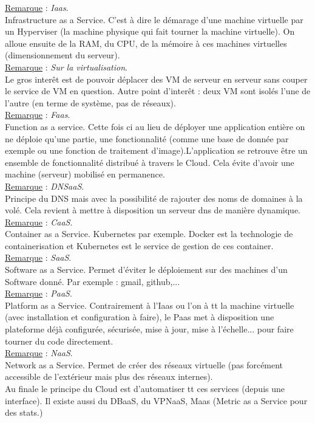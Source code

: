 \documentclass[a4paper,12pt,twoside]{article}
\newcommand{\rem}[2]{\noindent\underline{Remarque} : \textit{#1}.\\ \indent #2}
\begin{document}
\rem{Iaas}{Infrastructure as a Service. C'est à dire le démarage d'une machine virtuelle par un Hyperviser (la machine physique qui fait tourner la machine virtuelle). On alloue ensuite de la RAM, du CPU, de la mémoire à ces machines virtuelles (dimensionnement du serveur).}\\

\rem{Sur la virtualisation}{Le gros interêt est de pouvoir déplacer des VM de serveur en serveur sans couper le service de VM en question. Autre point d'interêt : deux VM sont isolés l'une de l'autre (en terme de système, pas de réseaux).}\\

\rem{Faas}{Function as a service. Cette fois ci au lieu de déployer une application entière on ne déploie qu'une partie, une fonctionnalité (comme une base de donnée par exemple ou une fonction de traitement d'image).L'application se retrouve être un ensemble de fonctionnalité distribué à travers le Cloud. Cela évite d'avoir une machine (serveur) mobilisé en permanence.}\\

\rem{DNSaaS}{Principe du DNS mais avec la possibilité de rajouter des noms de domaines à la volé. Cela revient à mettre à disposition un serveur dns de manière dynamique.}\\

\rem{CaaS}{Container as a Service. Kubernetes par exemple. Docker est la technologie de containerisation et Kubernetes est le service de gestion de ces container.}\\

\rem{SaaS}{Software as a Service. Permet d'éviter le déploiement sur des machines d'un Software donné. Par exemple : gmail, github,...}\\

\rem{PaaS}{Platform as a Service. Contrairement à l'Iaas ou l'on à tt la machine virtuelle (avec installation et configuration à faire), le Paas met à disposition une plateforme déjà configurée, sécurisée, mise à jour, mise à l'échelle... pour faire tourner du code directement.}\\

\rem{NaaS}{Network as a Service. Permet de créer des réseaux virtuelle (pas forcément accessible de l'extérieur mais plus des réseaux internes).}\\

Au finale le principe du Cloud est d'automatiser tt ces services (depuis une interface). Il existe aussi du DBaaS, du VPNaaS, Maas (Metric as a Service pour des stats.)\\
\end{document}
